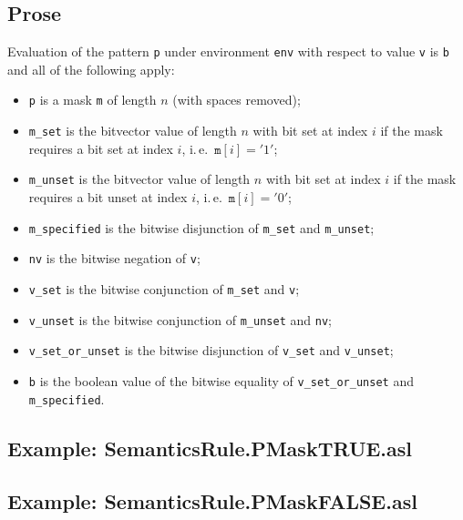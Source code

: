 \documentclass{book}
\begin{document}
    \subsection{Prose}
    Evaluation of the pattern \texttt{p} under environment \texttt{env} with
    respect to value \texttt{v} is \texttt{b} and all of the following apply:
    \begin{itemize}
      \item \texttt{p} is a mask \texttt{m} of length $n$ (with spaces removed);
      \item \texttt{m\_set} is the bitvector value of length $n$ with bit set
        at index $i$ if the mask requires a bit set at index $i$, i.\,e.\
        $\texttt{m}[i] = '1'$;
      \item \texttt{m\_unset} is the bitvector value of length $n$ with bit set
        at index $i$ if the mask requires a bit unset at index $i$, i.\,e.\
        $\texttt{m}[i] = '0'$;
      \item \texttt{m\_specified} is the bitwise disjunction of \texttt{m\_set}
        and \texttt{m\_unset};
      \item \texttt{nv} is the bitwise negation of \texttt{v};
      \item \texttt{v\_set} is the bitwise conjunction of \texttt{m\_set} and
        \texttt{v};
      \item \texttt{v\_unset} is the bitwise conjunction of \texttt{m\_unset} and
        \texttt{nv};
      \item \texttt{v\_set\_or\_unset} is the bitwise disjunction of
        \texttt{v\_set} and \texttt{v\_unset};
      \item \texttt{b} is the boolean value of the bitwise equality of
        \texttt{v\_set\_or\_unset} and \texttt{m\_specified}.
    \end{itemize}

    \subsection{Example: SemanticsRule.PMaskTRUE.asl}

    \subsection{Example: SemanticsRule.PMaskFALSE.asl}
\end{document}
